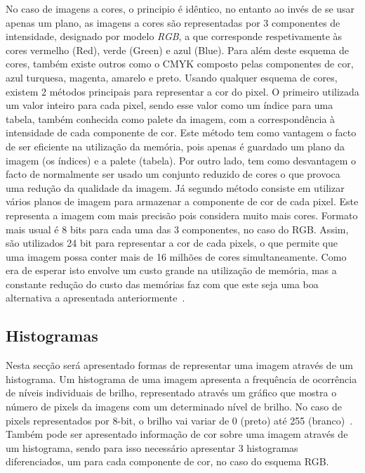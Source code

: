 No caso de imagens a cores, o principio é idêntico, no entanto ao invés de se usar apenas um plano, as imagens a cores são representadas por 3 componentes de intensidade, designado por modelo \textit{RGB}, a que corresponde respetivamente às cores vermelho (Red), verde (Green) e azul (Blue). Para além deste esquema de cores, também existe outros como o CMYK composto pelas componentes de cor, azul turquesa, magenta, amarelo e preto. Usando qualquer esquema de cores, existem 2 métodos principais para representar a cor do pixel. O primeiro utilizada um valor inteiro para cada pixel, sendo esse valor como um índice para uma tabela, também conhecida como palete da imagem, com a correspondência à intensidade de cada componente de cor. Este método tem como vantagem o facto de ser eficiente na utilização da memória, pois apenas é guardado um plano da imagem (os índices) e a palete (tabela). Por outro lado, tem como desvantagem o facto de normalmente ser usado um conjunto reduzido de cores o que provoca uma redução da qualidade da imagem. Já segundo método consiste em utilizar vários planos de imagem para armazenar a componente de cor de cada pixel. Este representa a imagem com mais precisão pois considera muito mais cores.  Formato mais usual é 8 bits para cada uma das 3 componentes, no caso do RGB. Assim, são utilizados 24 bit para representar a cor de cada pixels, o que permite que uma imagem possa conter mais de 16 milhões de cores simultaneamente. Como era de esperar isto envolve um custo grande na utilização de memória, mas a constante redução do custo das memórias faz com que este seja uma boa alternativa a apresentada anteriormente~\citet{Nixon2002}.

\subsection{Histogramas} \label{subsec:hist}

Nesta secção será apresentado formas de representar uma imagem através de um histograma. Um histograma de uma imagem apresenta a frequência de ocorrência de níveis individuais de brilho, representado através um gráfico que mostra o número de pixels da imagens com um determinado nível de brilho. No caso de pixels representados por 8-bit, o brilho vai variar de 0 (preto) até 255 (branco)~\citet{Nixon2002}. Também pode ser apresentado informação de cor sobre uma imagem através de um histograma, sendo para isso necessário apresentar 3 histogramas diferenciados, um para cada componente de cor, no caso do esquema RGB.

